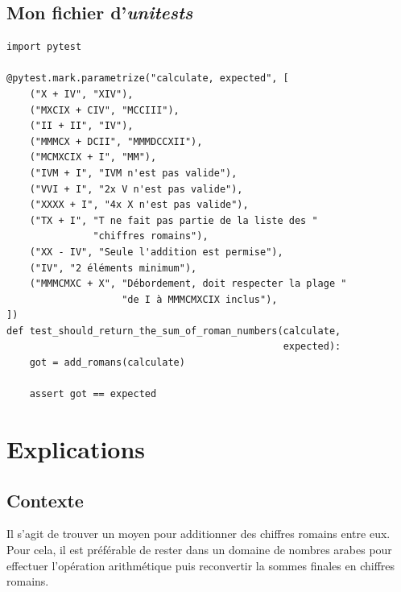 \subsection*{Mon fichier d'\textit{unitests}}
\begin{lstlisting}
import pytest

@pytest.mark.parametrize("calculate, expected", [
    ("X + IV", "XIV"),
    ("MXCIX + CIV", "MCCIII"),
    ("II + II", "IV"),
    ("MMMCX + DCII", "MMMDCCXII"),
    ("MCMXCIX + I", "MM"),
    ("IVM + I", "IVM n'est pas valide"),
    ("VVI + I", "2x V n'est pas valide"),
    ("XXXX + I", "4x X n'est pas valide"),
    ("TX + I", "T ne fait pas partie de la liste des "
               "chiffres romains"),
    ("XX - IV", "Seule l'addition est permise"),
    ("IV", "2 éléments minimum"),
    ("MMMCMXC + X", "Débordement, doit respecter la plage "
                    "de I à MMMCMXCIX inclus"),
])
def test_should_return_the_sum_of_roman_numbers(calculate,
                                                expected):
    got = add_romans(calculate)

    assert got == expected

\end{lstlisting}
\medskip

\section{Explications}
\subsection*{Contexte}
Il s'agit de trouver un moyen pour additionner des chiffres romains entre eux.  Pour cela, il est préférable de rester dans un domaine de nombres arabes pour effectuer l'opération arithmétique puis reconvertir la sommes finales en chiffres romains.
\medskip

